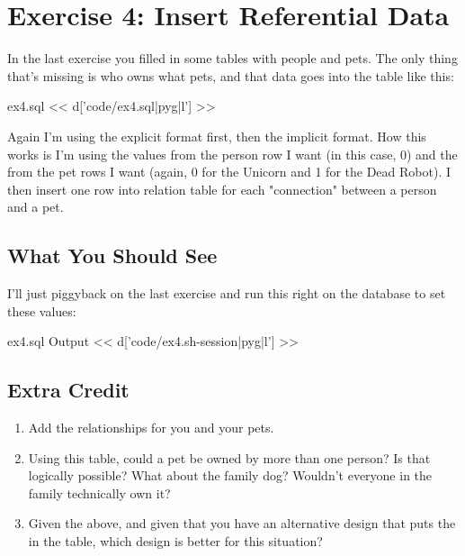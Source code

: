 \chapter{Exercise 4: Insert Referential Data}

In the last exercise you filled in some tables with people and pets.
The only thing that's missing is who owns what pets, and that data 
goes into the  table like this:

\begin{code}{ex4.sql}
<< d['code/ex4.sql|pyg|l'] >>
\end{code}

Again I'm using the explicit format first, then the implicit format.
How this works is I'm using the  values from the person
row I want (in this case, 0) and the  from the pet rows
I want (again, 0 for the Unicorn and 1 for the Dead Robot).  I then
insert one row into  relation table for each 
"connection" between a person and a pet.

\section{What You Should See}

I'll just piggyback on the last exercise and run this right on the
 database to set these values:

\begin{code}{ex4.sql Output}
<< d['code/ex4.sh-session|pyg|l'] >>
\end{code}


\section{Extra Credit}

\begin{enumerate}
\item Add the relationships for you and your pets.
\item Using this table, could a pet be owned by more than one person?  Is that logically possible?  What about the family dog? Wouldn't everyone in the family technically own it?
\item Given the above, and given that you have an alternative design that puts the  in the  table, which design is better for this situation?
\end{enumerate}


